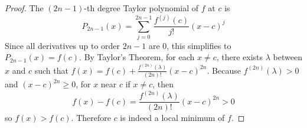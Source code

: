\documentclass[11pt]{article}
\begin{document}
\begin{exercise}{1}
    \begin{proof}
        The $(2n - 1)$-th degree Taylor polynomial of $f$ at $c$ is $$P_{2n - 1} (x) = \sum_{j = 0}^{2n - 1} \frac{f^{(j)}(c)}{j!} (x - c)^j$$ Since all derivatives up to order $2n - 1$ are 0, this simplifies to $P_{2n - 1}(x) = f(c)$. By Taylor's Theorem, for each $x \neq c$, there exists $\lambda$ between $x$ and $c$ such that $f(x) = f(c) + \frac{f^{(2n)}(\lambda)}{(2n)!}(x - c)^{2n}$. Because $f^{(2n)}(\lambda) > 0$ and $(x - c)^{2n} \ge 0$, for $x$ near $c$ if $x \neq c$, then $$f(x) - f(c) = \frac{f^{(2n)}(\lambda)}{(2n)!} (x - c)^{2n} > 0$$ so $f(x) > f(c)$. Therefore $c$ is indeed a local minimum of $f$. 
    \end{proof}
\end{exercise}
\end{document}
